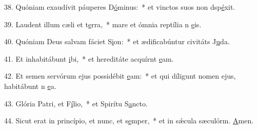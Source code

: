 38. Quóniam exaudívit páuperes D\uline{ó}minus:~* et vinctos suos non dsp\uline{é}xit.\par 
39. Laudent illum cæli et t\uline{e}rra,~* mare et ómnia reptília n \uline{e}is.\par 
40. Quóniam Deus salvam fáciet S\uline{i}on:~* et ædificabúntur civitáts J\uline{u}da.\par 
41. Et inhabitábunt \uline{i}bi,~* et hereditáte acquírnt \uline{e}am.\par 
42. Et semen servórum ejus possidébit \uline{e}am:~* et qui díligunt nomen ejus, habitábunt n \uline{e}a.\par 
43. Glória Patri, et F\uline{í}lio,~* et Spirítu S\uline{a}ncto.\par 
44. Sicut erat in princípio, et nunc, et s\uline{e}mper,~* et in sǽcula sæculórm. \uline{A}men.\par 
